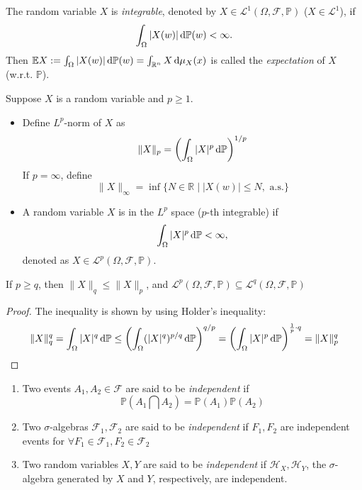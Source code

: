 \begin{enumerate}
\begin{definition}[Integrable]
The random variable $X$ is \emph{integrable}, denoted by $X\in\mathcal{L}^1(\Omega,\mathcal{F},\mathbb{P})$ ($X\in\mathcal{L}^1$), if 
\[
\int_\Omega|X(w)|\,\mathrm{d}\mathbb{P}(w)<\infty.
\]
Then $\mathbb{E}X:=\int_\Omega|X(w)|\,\mathrm{d}\mathbb{P}(w)=\int_{\mathbb{R}^n}X\,\mathrm{d}\mu_X(x)$ is called the \emph{expectation} of $X$ (w.r.t. $\mathbb{P}$). 
\end{definition}
\begin{definition}[$L^p$ space]
Suppose $X$ is a random variable and $p\ge1$.
\begin{itemize}
\item
Define $L^p$-norm of $X$ as
\[
\|X\|_p=\left(\int_\Omega|X|^p\,\mathrm{d}\mathbb{P}\right)^{1/p}
\]
If $p=\infty$, define
\[
\|X\|_\infty=\inf\{N\in\mathbb{R}\mid|X(w)|\le N,\text{ a.s.}\}
\]
\item
A random variable $X$ is in the $L^p$ space ($p$-th integrable) if
\[
\int_\Omega|X|^p\,\mathrm{d}\mathbb{P}<\infty,
\]
denoted as $X\in\mathcal{L}^p(\Omega,\mathcal{F},\mathbb{P})$.
\end{itemize}
\end{definition}
\begin{proposition}
If $p\ge q$, then $\|X\|_q\le\|X\|_p$, and $\mathcal{L}^p(\Omega,\mathcal{F},\mathbb{P})\subseteq\mathcal{L}^q(\Omega,\mathcal{F},\mathbb{P})$
\end{proposition}
\begin{proof}
The inequality is shown by using Holder's inequality:
\[
\|X\|_q^q=\int_\Omega|X|^q\,\mathrm{d}\mathbb{P}
\le
\left(\int_\Omega(|X|^q)^{p/q}\,\mathrm{d}\mathbb{P}\right)^{q/p}
=
\left(
\int_\Omega|X|^p\,\mathrm{d}\mathbb{P}
\right)^{\frac{1}{p}\cdot q}
=
\|X\|_p^q
\]
\end{proof}
\begin{definition}[Independence]
\begin{enumerate}
\item
Two events $A_1,A_2\in\mathcal{F}$ are said to be \emph{independent} if
\[
\mathbb{P}(A_1\bigcap A_2)=\mathbb{P}(A_1)\mathbb{P}(A_2)
\]
\item
Two $\sigma$-algebras $\mathcal{F}_1,\mathcal{F}_2$ are said to be \emph{independent} if $F_1,F_2$ are independent events for $\forall F_1\in\mathcal{F}_1,F_2\in\mathcal{F}_2$
\item
Two random variables $X,Y$ are said to be \emph{independent} if $\mathcal{H}_X,\mathcal{H}_Y$, the $\sigma$-algebra generated by $X$ and $Y$, respectively, are independent.
\end{enumerate}
\end{definition}


















\end{enumerate}